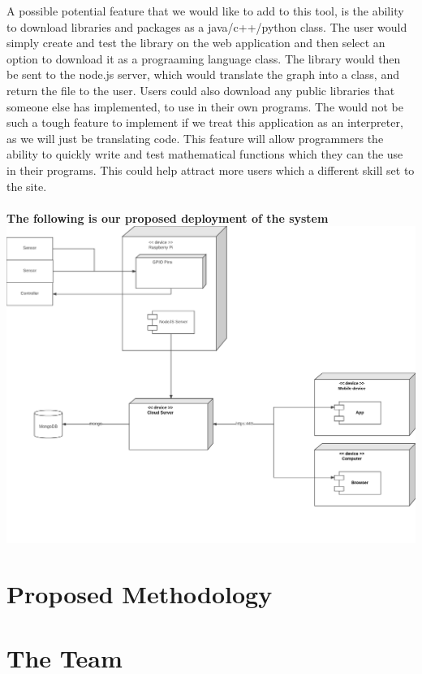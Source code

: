 \documentclass{article}
\begin{document}
    A possible potential feature that we would like to add to this tool, is the ability to download libraries and packages as a java/c++/python 
    class. The user would simply create and test the library on the web application and then select an option to download it as a prograaming
    language class. The library would then be sent to the node.js server, which would translate the graph into a class, and return the file to 
    the user. Users could also download any public libraries that someone else has implemented, to use in their own programs. The would not be 
    such a tough feature to implement if we treat this application as an interpreter, as we will just be translating code. This feature will 
    allow programmers the ability to quickly write and test mathematical functions which they can the use in their programs. This could help 
    attract more users which a different skill set to the site. \\
    \\
    \noindent\textbf{The following is our proposed deployment of the system} \\
    \includegraphics[width=\textwidth]{deployment}

	\newpage
	\section{Proposed Methodology}
	
	\newpage
	\section{The Team}
	
\end{document}
